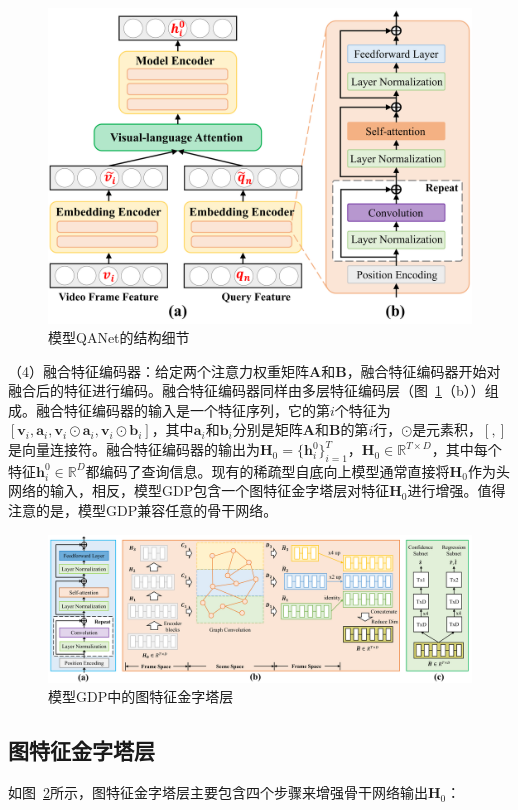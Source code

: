 \begin{figure}[t]
    \centering
    \includegraphics[width=0.8\linewidth]{chapter6/res/qanet.pdf}
    \caption{模型QANet的结构细节}
    \label{ch6:fig:qanet}
\end{figure}

（4）融合特征编码器：给定两个注意力权重矩阵$\bm{A}$和$\bm{B}$，融合特征编码器开始对融合后的特征进行编码。融合特征编码器同样由多层特征编码层（图~\ref{ch6:fig:qanet}（b））组成。融合特征编码器的输入是一个特征序列，它的第$i$个特征为$[\bm{v}_i, \bm{a}_i, \bm{v}_i\odot \bm{a}_i, \bm{v}_i\odot \bm{b}_i]$，其中$\bm{a}_i$和$\bm{b}_i$分别是矩阵$\bm{A}$和$\bm{B}$的第$i$行，$\odot$是元素积，$[,]$是向量连接符。融合特征编码器的输出为$\bm{H}_0=\{\bm{h}^0_i\}^T_{i=1}$，$\bm{H}_0 \in \mathbb{R}^{T\times D}$，其中每个特征$\bm{h}^0_i \in \mathbb{R}^D$都编码了查询信息。现有的稀疏型自底向上模型通常直接将$\bm{H}_0$作为头网络的输入，相反，模型GDP包含一个图特征金字塔层对特征$\bm{H}_0$进行增强。值得注意的是，模型GDP兼容任意的骨干网络。

\begin{figure}[t]
    \centering
    \includegraphics[width=0.98\linewidth]{chapter6/res/graph_fpn.pdf}
    \caption{模型GDP中的图特征金字塔层}
    \label{ch6:fig:graph_fpn}
\end{figure}

\subsection{图特征金字塔层}
如图~\ref{ch6:fig:graph_fpn}所示，图特征金字塔层主要包含四个步骤来增强骨干网络输出$\bm{H}_0$：

